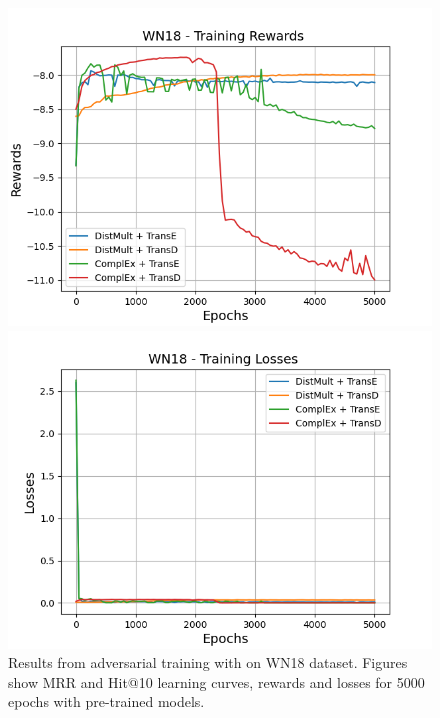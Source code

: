 \begin{figure}
    \begin{minipage}{.5\textwidth}
      \centering
      \includegraphics[width=\linewidth]{figures/results/gan_train/pretrained/uncertainty/max/entropy/wn18/5k_epochs/uncertainty_wn18_rew.png}
    \end{minipage}%
     \begin{minipage}{.5\textwidth}
      \centering
      \includegraphics[width=\linewidth]{figures/results/gan_train/pretrained/uncertainty/max/entropy/wn18/5k_epochs/uncertainty_wn18_losses.png}
    \end{minipage}%
    \caption{Results from adversarial training with \usmax on \textsc{WN18} dataset.
    Figures show MRR and Hit@10 learning curves, rewards and losses for 5000 epochs with pre-trained models.}
    \label{fig:gan_train_pretrained_usmax_wn18}
\end{figure}
